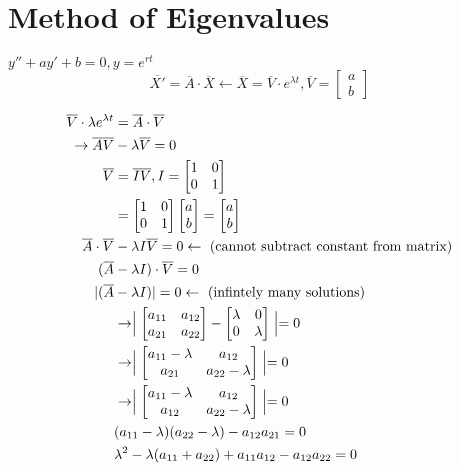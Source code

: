\documentclass[10pt, letterpaper]{article}
\begin{document}
\section{Method of Eigenvalues}
$y''+ay'+b=0, y=e^{rt}$\\
\begin{equation*}
\overline{X'} = \overline{A} \cdot \overline{X} \leftarrow \overline{X} = \overline{V} \cdot e^{\lambda t}, \overline{V} = \begin{bmatrix}
	a\\
	b
\end{bmatrix}
\end{equation*}

\begin{align*}
\overline{V} \cdot \lambda e^{\lambda t} &= \overline{A} \cdot \overline{V}\\
\rightarrow \overline{A} \overline{V} &- \lambda \overline{V} = 0\\
\overline{V} &= \overline{I} \overline{V}, I=\begin{bmatrix}
	1 & 0\\
	0 & 1
\end{bmatrix}\\
&= \begin{bmatrix}
	1 & 0\\
	0 & 1
\end{bmatrix} \begin{bmatrix}
	a\\
	b
\end{bmatrix} = \begin{bmatrix}
	a\\
	b
\end{bmatrix}\\
\overline{A} \cdot \overline{V} &- \lambda I \overline{V} = 0 \leftarrow \text{ (cannot subtract constant from matrix)}\\
(\overline{A} &- \lambda I ) \cdot \overline{V} = 0\\
| (\overline{A} &- \lambda I) | = 0 \leftarrow \text{ (infintely many solutions)}\\
&\rightarrow \Bigm| \begin{bmatrix}
	a_{11} & a_{12}\\
	a_{21} & a_{22}
\end{bmatrix} - \begin{bmatrix}
	\lambda & 0\\
	0 & \lambda
\end{bmatrix} \Bigm| = 0\\
&\rightarrow \Bigm| \begin{bmatrix}
	a_{11}-\lambda & a_{12}\\
	a_{21} & a_{22}-\lambda
\end{bmatrix} \Bigm| = 0\\
&\rightarrow \Bigm| \begin{bmatrix}
	a_{11}-\lambda & a_{12}\\
	a_{12} & a_{22}-\lambda
\end{bmatrix} \Bigm| = 0\\
&(a_{11}-\lambda)(a_{22}-\lambda)-a_{12}a_{21}=0\\
&\lambda^2-\lambda(a_{11} + a_{22})+a_{11}a_{12}-a_{12}a_{22}=0
\end{align*}
\end{document}
